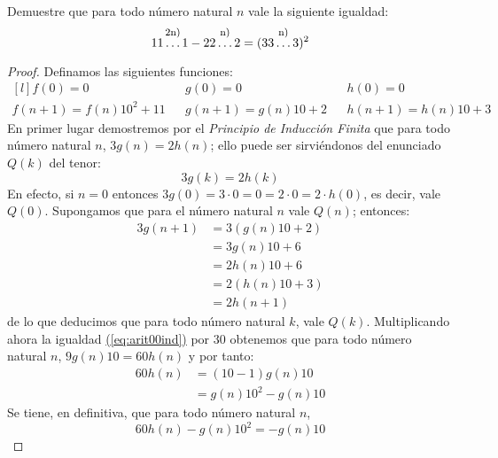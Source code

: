   \begin{exercise}
    Demuestre que para todo número natural $n$ vale la siguiente
    igualdad:
    \begin{equation*}
      11\bottominset{\footnotesize 2n)}{\,\ldots}{2.5mm}{}1
      - 22\bottominset{\footnotesize n)}{\,\ldots}{2.5mm}{}2
      = (33\bottominset{\footnotesize n)}{\,\ldots}{2.5mm}{}3)^{2}
    \end{equation*}
  \end{exercise}

  \begin{proof}
    Definamos las siguientes funciones:
    \begin{equation*}
      \begin{matrix*}[l]
      f(0)  = 0          &&g(0)   =0       &&h(0)  =0\\
      f(n+1)=f(n)10^{2}+11&&g(n+1)=g(n)10+2&&h(n+1)=h(n)10+3
    \end{matrix*}      
  \end{equation*}
  En primer lugar demostremos por el \textit{Principio de Inducción
    Finita} que para todo número natural $n$, $3g(n)=2h(n)$; ello
  puede ser sirviéndonos del enunciado $Q(k)$ del tenor:
  \begin{equation}
    \label{eq:arit00ind}
    3g(k)=2h(k)
  \end{equation}
  En efecto, si $n=0$ entonces $3g(0)=3\cdot 0=0=2\cdot 0=2\cdot
  h(0)$, es decir, vale $Q(0)$. Supongamos que para el número natural
  $n$ vale $Q(n)$; entonces:
  \begin{align*}
    3g(n+1)&=3(g(n)10+2)\\
           &=3g(n)10+6\\
           &=2h(n)10+6\\
           &=2(h(n)10+3)\\
           &=2h(n+1)
  \end{align*}
  de lo que deducimos que para todo número natural $k$, vale
  $Q(k)$. Multiplicando ahora la igualdad
  \hyperref[eq:arit00ind]{(\ref*{eq:arit00ind})} por $30$ obtenemos que para
  todo número natural $n$, $9g(n)10=60h(n)$ y por tanto:
  \begin{align*}
    60h(n)&=(10-1)g(n)10\\
          &=g(n)10^{2}-g(n)10
  \end{align*}
  Se tiene, en definitiva, que para todo número natural $n$,
  \begin{equation}
    \label{eq:arit01ind}
    60h(n)-g(n)10^{2}=-g(n)10
  \end{equation}

\end{proof}
